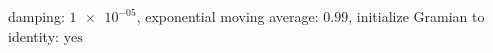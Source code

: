 damping: $\num[scientific-notation=true]{1e-05}$, exponential moving average: $\num[scientific-notation=true]{0.99}$, initialize Gramian to identity: $\text{yes}$